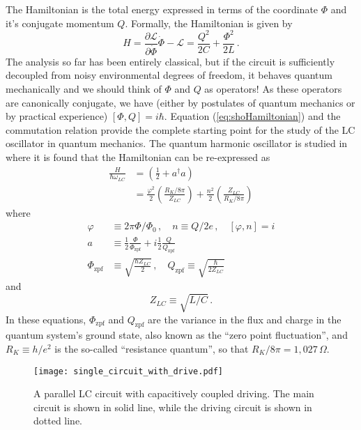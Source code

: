 The Hamiltonian is the total energy expressed in terms of the coordinate $\Phi$ and it's conjugate momentum $Q$.
Formally, the Hamiltonian is given by
\begin{equation}
  H
  = \frac{\partial \mathcal{L}}{\partial \dot{\Phi}} \dot{\Phi} - \mathcal{L}
  = \frac{Q^2}{2C} + \frac{\Phi^2}{2L} \, . \label{eq:shoHamiltonian}
\end{equation}
The analysis so far has been entirely classical, but if the circuit is sufficiently decoupled from noisy environmental degrees of freedom, it behaves quantum mechanically and we should think of $\Phi$ and $Q$ as operators!
As these operators are canonically conjugate, we have (either by postulates of quantum mechanics or by practical experience) $[\Phi,Q]=i\hbar$.
Equation (\ref{eq:shoHamiltonian}) and the commutation relation provide the complete starting point for the study of the LC oscillator in quantum mechanics.
The quantum harmonic oscillator is studied in \citeinternaltype {} where it is found that the Hamiltonian can be re-expressed as
\begin{align}
  \frac{H}{\hbar \omega_{LC}}
  &= \left( \frac{1}{2} + a^\dagger a \right) \nonumber \\
  &= \frac{\varphi^2}{2} \left( \frac{R_K / 8 \pi}{Z_{LC}} \right)
   + \frac{n^2}{2} \left( \frac{Z_{LC}}{R_K / 8 \pi} \right)
\end{align}
where
\begin{align}
  \varphi &\equiv 2 \pi \Phi / \Phi_0 \, , \quad n \equiv Q / 2e \, , \quad [\varphi, n] = i \\
  a &\equiv
      \frac{1}{2} \frac{\Phi}{\Phi_\text{zpf}}
  + i \frac{1}{2} \frac{Q}{Q_\text{zpf}} \\
  \Phi_\text{zpf} &\equiv \sqrt{\frac{\hbar Z_{LC}}{2}} \, , \quad
  Q_\text{zpf} \equiv \sqrt{\frac{\hbar}{2 Z_{LC}}}
\end{align}
and
\begin{equation}
  Z_{LC} \equiv \sqrt{L/C} \, .
\end{equation}
In these equations, $\Phi_\text{zpf}$ and $Q_\text{zpf}$ are the variance in the flux and charge in the quantum system's ground state, also known as the ``zero point fluctuation'', and $R_K \equiv h / e^2$ is the so-called ``resistance quantum'', so that $R_K / 8 \pi = 1,027 \, \Omega$.

\begin{figure}
\begin{centering}
\texttt{[image: single\_circuit\_with\_drive.pdf]} 
\par\end{centering}
  \caption{A parallel LC circuit with capacitively coupled driving. The main circuit is shown in solid line, while the driving circuit is shown in dotted line.}
\label{Fig:singleCircuit}
\end{figure}

